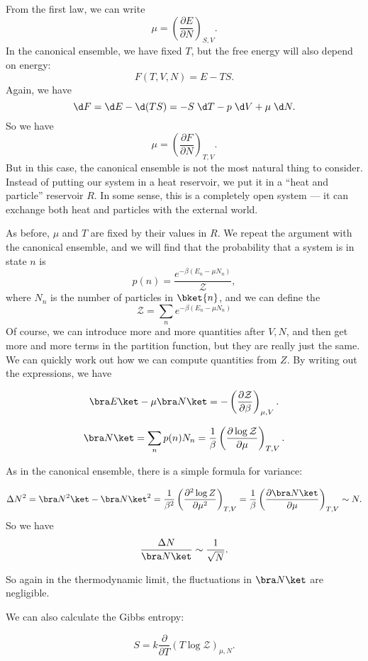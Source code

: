\documentclass[a4paper]{article}
\begin{document}
From the first law, we can write
\[
  \mu = \left(\frac{\partial E}{\partial N}\right)_{S, V}.
\]
In the canonical ensemble, we have fixed $T$, but the free energy will also depend on energy:
\[
  F(T, V, N) = E - TS.
\]
Again, we have
\[
  \d F = \d E - \d (TS) = -S\;\d T - p\;\d V + \mu\;\d N.
\]
So we have
\[
  \mu = \left(\frac{\partial F}{\partial N}\right)_{T, V}.
\]
But in this case, the canonical ensemble is not the most natural thing to consider. Instead of putting our system in a heat reservoir, we put it in a ``heat and particle'' reservoir $R$. In some sense, this is a completely open system --- it can exchange both heat and particles with the external world.

As before, $\mu$ and $T$ are fixed by their values in $R$. We repeat the argument with the canonical ensemble, and we will find that the probability that a system is in state $n$ is
\[
  p(n) = \frac{e^{-\beta (E_n - \mu N_n)}}{\mathcal{Z}},
\]
where $N_n$ is the number of particles in $\bket{n}$, and we can define the 
\[
  \mathcal{Z} = \sum_n e^{-\beta(E_n- \mu N_n)}
\]
Of course, we can introduce more and more quantities after $V, N$, and then get more and more terms in the partition function, but they are really just the same. We can quickly work out how we can compute quantities from $Z$. By writing out the expressions, we have
\begin{prop}
  \[
    \bra E \ket - \mu \bra N\ket = -\left(\frac{\partial \mathcal{Z}}{\partial \beta}\right)_{\mu, V}.
  \]
\end{prop}

\begin{prop}
  \[
    \bra N\ket = \sum_n p(n) N_n = \frac{1}{\beta} \left(\frac{\partial \log \mathcal{Z}}{\partial \mu}\right)_{T, V}.
  \]
\end{prop}

As in the canonical ensemble, there is a simple formula for variance:
\begin{prop}
  \[
    \Delta N^2 = \bra N^2 \ket - \bra N\ket^2 = \frac{1}{\beta^2} \left(\frac{\partial^2 \log Z}{\partial \mu^2}\right)_{T, V} = \frac{1}{\beta} \left(\frac{\partial \bra N\ket}{\partial \mu}\right)_{T, V} \sim N.
  \]
  So we have
  \[
    \frac{\Delta N}{ \bra N\ket} \sim \frac{1}{\sqrt{N}}.
  \]
\end{prop}

So again in the thermodynamic limit, the fluctuations in $\bra N\ket$ are negligible.

We can also calculate the Gibbs entropy:
\begin{prop}
  \[
    S = k \frac{\partial}{\partial T}(T \log \mathcal{Z})_{\mu, N}.
  \]
\end{prop}
\end{document}
